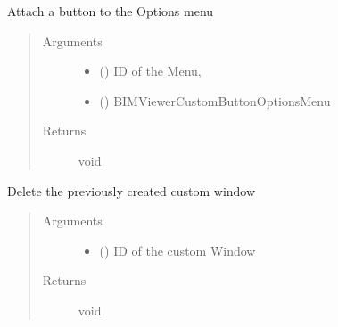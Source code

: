 \documentclass[a4paper,12pt,english]{sphinxmanual}
\begin{document}
\begin{fulllineitems}
\label{\detokenize{viewer/parameters:BIMDataViewer.addCustomButtonMenu}}
Attach a button to the Options menu
\begin{quote}\begin{description}
\item[{Arguments}] \leavevmode\begin{itemize}
\item {} 
 () \textendash{} ID of the Menu,

\item {} 
 () \textendash{}  BIMViewerCustomButtonOptionsMenu

\end{itemize}

\item[{Returns}] \leavevmode
void

\end{description}\end{quote}

\end{fulllineitems}



\begin{fulllineitems}
\label{\detokenize{viewer/parameters:BIMDataViewer.removeCustomWindow}}
Delete the previously created custom window
\begin{quote}\begin{description}
\item[{Arguments}] \leavevmode\begin{itemize}
\item {} 
 () \textendash{} ID of the custom Window

\end{itemize}

\item[{Returns}] \leavevmode
void

\end{description}\end{quote}

\end{fulllineitems}
\end{document}
